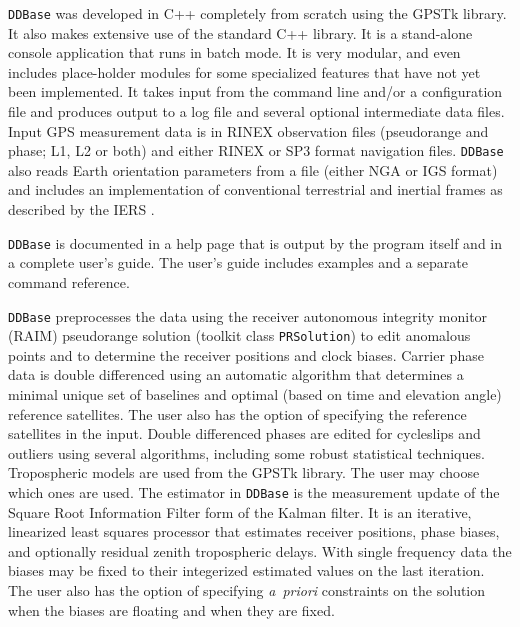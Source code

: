 \documentclass{ion-gps}
\newcommand{\gpstkapplication}[1]{\texttt{#1}}
\newcommand{\gpstkclass}[1]{\texttt{#1}}
\begin{document}
\gpstkapplication{DDBase} was developed in C++ completely from scratch
using the GPSTk library. It also makes extensive use of the standard
C++ library. It is a stand-alone console application that runs in
batch mode. It is very modular, and even includes place-holder
modules for some specialized features that have not yet been
implemented. It takes input from the command line and/or a
configuration file and produces output to a log file and several
optional intermediate data files. Input GPS measurement data is in
RINEX observation files (pseudorange and phase; L1, L2 or both) and
either RINEX or SP3 format navigation
files. \gpstkapplication{DDBase} also reads Earth orientation
parameters from a file (either NGA or IGS format) and includes an
implementation of conventional terrestrial and inertial frames as described by the IERS
\cite[Chapter 5]{iersconventions}.

\gpstkapplication{DDBase} is documented in a help page that is
output by the program itself and in a complete user's guide.
The user's guide includes examples and a separate command reference. 

\gpstkapplication{DDBase} preprocesses the data using the receiver autonomous integrity monitor
(RAIM) pseudorange solution (toolkit
class \gpstkclass{PRSolution}) to edit anomalous points and to
determine the receiver positions and clock biases. Carrier phase data
is double differenced using an automatic algorithm that determines a
minimal unique set of baselines and optimal (based on time and
elevation angle) reference satellites. The user also has the option of
specifying the reference satellites in the input. Double differenced
phases are edited for cycleslips and outliers using several
algorithms, including some robust statistical techniques. Tropospheric
models are used from the GPSTk library.  The user may choose which ones
are used. The estimator in \gpstkapplication{DDBase} is the
measurement update of the Square Root Information Filter form of the
Kalman filter. It is an iterative, linearized
least squares processor that estimates receiver positions, phase
biases, and optionally residual zenith tropospheric delays. With
single frequency data the biases may be fixed to their integerized
estimated values on the last iteration. The user also has the option
of specifying \mbox{{\it a priori}} constraints on the solution when the
biases are floating and when they are fixed.
\end{document}
